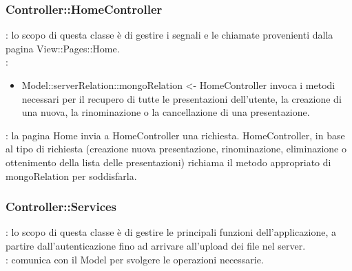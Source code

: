 {	\subsubsection{Controller::\-HomeController}{
		\textbf{\tipo}: lo scopo di questa classe è di gestire i segnali e le chiamate provenienti dalla pagina View::\-Pages::\-Home.\\	
		\textbf{\relaz}:
		\begin{itemize}
			\item Model::\-serverRelation::\-mongoRelation <- HomeController invoca i metodi necessari per il recupero di tutte le presentazioni dell'utente, la creazione di una nuova, la rinominazione o la cancellazione di una presentazione.
		\end{itemize}
		\textbf{\interfacce}: la pagina Home invia a HomeController una richiesta. HomeController, in base al tipo di richiesta (creazione nuova presentazione, rinominazione, eliminazione o ottenimento della lista delle presentazioni) richiama il metodo appropriato di mongoRelation per soddisfarla.
	}


	\subsubsection{Controller::\-Services}{
		\textbf{\tipo}: lo scopo di questa classe è di gestire le principali funzioni dell'applicazione, a partire dall'autenticazione fino ad arrivare all'upload dei file nel server.\\	
		\textbf{\relaz}: comunica con il Model per svolgere le operazioni necessarie.


}}
